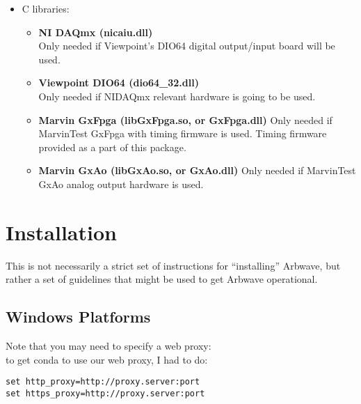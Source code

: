 \begin{itemize}
  \item C libraries:
    \begin{itemize}
    \item \textbf{NI DAQmx (nicaiu.dll)} \\
      Only needed if Viewpoint's DIO64 digital output/input board will be used.
    \item \textbf{Viewpoint DIO64 (dio64\_32.dll)} \\
      Only needed if NIDAQmx relevant hardware is going to be used.
    \item \textbf{Marvin GxFpga (libGxFpga.so, or GxFpga.dll)}
      Only needed if MarvinTest GxFpga with timing firmware is used.
      Timing firmware provided as a part of this package.
    \item \textbf{Marvin GxAo (libGxAo.so, or GxAo.dll)}
      Only needed if MarvinTest GxAo analog output hardware is used.
    \end{itemize}
\end{itemize}

\section{Installation}
This is not necessarily a strict set of instructions for ``installing'' Arbwave,
but rather a set of guidelines that might be used to get Arbwave operational.

\subsection{Windows Platforms}

Note that you may need to specify a web proxy:\\
to get conda to use our web proxy, I had to do:
\begin{verbatim}
set http_proxy=http://proxy.server:port
set https_proxy=http://proxy.server:port
\end{verbatim}


